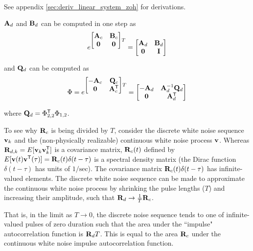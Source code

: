 See appendix \ref{sec:deriv_linear_system_zoh} for derivations.

$\mathbf{A}_d$ and $\mathbf{B}_d$ can be computed in one step as
\begin{equation*}
  e^{
  \begin{bmatrix}
    \mathbf{A}_c & \mathbf{B}_c \\
    \mathbf{0} & \mathbf{0}
  \end{bmatrix}T} =
  \begin{bmatrix}
    \mathbf{A}_d & \mathbf{B}_d \\
    \mathbf{0} & \mathbf{I}
  \end{bmatrix}
\end{equation*}

and $\mathbf{Q}_d$ can be computed as
\begin{equation*}
  \Phi = e^{
  \begin{bmatrix}
    -\mathbf{A}_c & \mathbf{Q}_c \\
    \mathbf{0} & \mathbf{A}_c^\mathsf{T}
  \end{bmatrix}T} =
  \begin{bmatrix}
    -\mathbf{A}_d & \mathbf{A}_d^{-1} \mathbf{Q}_d \\
    \mathbf{0} & \mathbf{A}_d^\mathsf{T}
  \end{bmatrix}
\end{equation*}

where
$\mathbf{Q}_d = \Phi_{2,2}^\mathsf{T} \Phi_{1,2}$.

To see why $\mathbf{R}_c$ is being divided by $T$, consider the discrete white
noise sequence $\mathbf{v}_k$ and the (non-physically realizable) continuous white
noise process $\mathbf{v}$. Whereas $\mathbf{R}_{d,k} = E[\mathbf{v}_k \mathbf{v}_k^\mathsf{T}]$ is a
covariance matrix, $\mathbf{R}_c(t)$ defined by
$E[\mathbf{v}(t) \mathbf{v}^\mathsf{T}(\tau)] = \mathbf{R}_c(t)\delta(t - \tau)$ is a spectral
density matrix (the Dirac function $\delta(t - \tau)$ has units of
$1/\text{sec}$). The covariance matrix $\mathbf{R}_c(t)\delta(t - \tau)$ has
infinite-valued elements. The discrete white noise sequence can be made to
approximate the continuous white noise process by shrinking the pulse lengths
($T$) and increasing their amplitude, such that
$\mathbf{R}_d \rightarrow \frac{1}{T}\mathbf{R}_c$.

That is, in the limit as $T \rightarrow 0$, the discrete noise sequence tends to
one of infinite-valued pulses of zero duration such that the area under the
``impulse" autocorrelation function is $\mathbf{R}_d T$. This is equal to the area
$\mathbf{R}_c$ under the continuous white noise impulse autocorrelation function.
